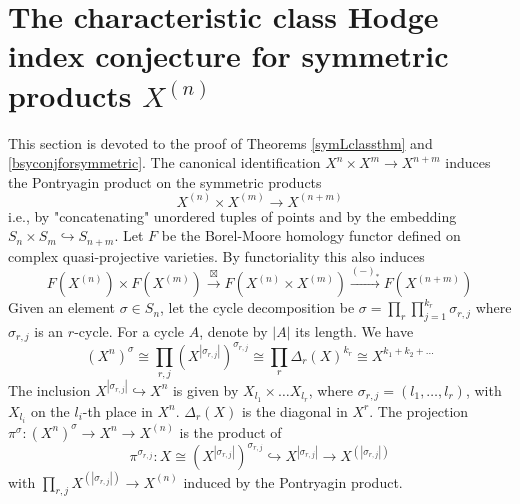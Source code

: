 \documentclass[11pt,leqno,twoside]{amsart}
\theoremstyle{plainsl}
\theoremstyle{definition}
\begin{document}
\section{The characteristic class Hodge index conjecture for symmetric products $X^{(n)}$}

This section is devoted to the proof of Theorems \ref{symLclassthm} and \ref{bsyconjforsymmetric}. The canonical identification $X^n\times X^m\rightarrow X^{n+m}$ induces
the Pontryagin product on the symmetric products  \cite[Def. 1.1]{CMSSY} 
\[X^{(n)}\times X^{(m)} \xrightarrow{} X^{(n+m)}\]
i.e., by "concatenating"  unordered tuples of points  and by the embedding $S_n\times S_m \hookrightarrow S_{n+m}$.
 Let $F$ be the Borel-Moore homology functor  defined on complex
quasi-projective varieties. By functoriality this also induces
\[F(X^{(n)})\times F(X^{(m)})\xrightarrow{\boxtimes}F(X^{(n)}\times X^{(m)}) \xrightarrow{(-)_*} F(X^{(n+m)})\]
Given an element $\sigma\in S_n$, let the cycle decomposition be $\sigma=\prod_r\prod^{k_r}_{j=1}\sigma_{r,j}$ where  $\sigma_{r,j}$ is an $r$-cycle. For a cycle $A$, denote by $|A|$ its length. We have \cite[\S~3.1]{CMSSY}
\[(X^n)^{\sigma}\cong \prod_{r,j} (X^{|\sigma_{r,j}|})^{\sigma_{r,j}}\cong \prod_{r}\Delta_r(X)^{k_r}\cong X^{k_1+k_2+\ldots}\]
 The inclusion $X^{|\sigma_{r,j}|}\hookrightarrow X^n$ is given by $X_{l_1}\times \ldots X_{l_r}$, where $\sigma_{r,j}=(l_1,\ldots,l_r)$, with $X_{l_i}$ on the $l_i$-th place in $X^n$. $\Delta_r(X)$ is the diagonal in $X^r$.  The projection $\pi^{\sigma}:(X^n)^{\sigma}\rightarrow X^n \rightarrow X^{(n)}$ is the product of
\[\pi^{\sigma_{r,j}}:X\cong (X^{|\sigma_{r,j}|})^{\sigma_{r,j}} \hookrightarrow X^{|\sigma_{r,j}|} \rightarrow X^{(|\sigma_{r,j}|)}\]
with $\prod_{r,j} X^{(|\sigma_{r,j}|)}\rightarrow X^{(n)}$
induced by the Pontryagin product.
\end{document}
